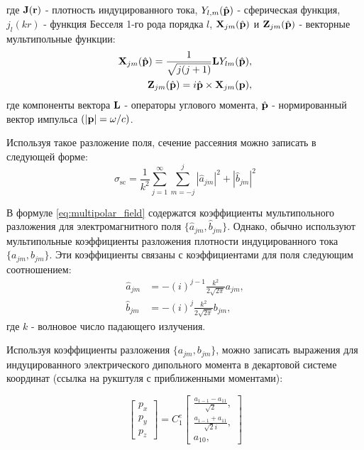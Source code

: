 где $\vb{J}(\vb{r})$ - плотность индуцированного тока, $Y_{l,m}(\hat{\vb{p}})$ - сферическая функция, $j_l(kr)$ - функция Бесселя 1-го рода порядка $l$, $\vb{X}_{jm}(\hat{\vb{p}})$ и $\vb{Z}_{jm}(\hat{\vb{p}})$ - векторные мультипольные функции:
\begin{equation}
    \begin{aligned}
        \vb{X}_{jm}(\hat{\vb{p}}) = \frac{1}{\sqrt{j(j+1)}} \vb{L} Y_{lm}(\hat{\vb{p}}), \\
        \vb{Z}_{jm}(\hat{\vb{p}}) = i \hat{\vb{p}} \times \vb{X}_{jm}(\vb{p}),
    \end{aligned}
\end{equation}
где компоненты вектора $\vb{L}$ - операторы углового момента, $\hat{\vb{p}}$ - нормированный вектор импульса $(|\vb{p}| = \omega/c)$.

Используя такое разложение поля, сечение рассеяния можно записать в следующей форме:
\begin{equation}
    \sigma_{\text{sc}} = \frac{1}{k^2} \sum_{j=1}^{\infty} \sum_{m=-j}^j |\hat{a}_{jm} |^2 + |\hat{b}_{jm}|^2 \label{eq:scat_sc}
\end{equation}

В формуле \eqref{eq:multipolar_field} содержатся коэффициенты мультипольного разложения для электромагнитного поля $\{\hat{a}_{jm}, \hat{b}_{jm}\}$. Однако, обычно используют мультипольные коэффициенты разложения плотности индуцированного тока $\{a_{jm}, b_{jm}\}$. Эти коэффициенты связаны с коэффициентами для поля следующим соотношением:
\begin{align}
    \hat{a}_{jm} &= -(i)^{j-1} \frac{k^2}{2 \sqrt{2 \pi}} a_{jm},\\
    \hat{b}_{jm} &= -(i)^j \frac{k^2}{2 \sqrt{2 \pi}} b_{jm},
\end{align}
где $k$ - волновое число падающего излучения. 

Используя коэффициенты разложения $\{a_{jm}, b_{jm}\}$, можно записать выражения для индуцированного электрического дипольного момента в декартовой системе координат (ссылка на рукштуля с приближенными моментами):

\begin{equation}
    \begin{bmatrix}
        p_x \\
        p_y \\
        p_z
    \end{bmatrix} = C^e_1 \begin{bmatrix}
        \frac{a_{1-1} - a_{11}}{\sqrt{2}},\\
        \frac{a_{1-1}+a_{11}}{\sqrt{2}i},\\
        a_{10},
    \end{bmatrix}
\end{equation}

